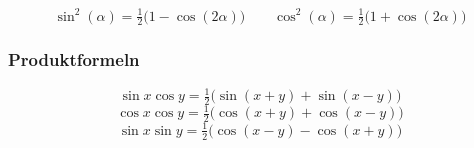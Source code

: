 \documentclass[../zusammenfassung_AN.tex]{subfiles}
\begin{document}
	\begin{tcolorbox}[dglbox, title={Quadratische Ausdrücke (aus Doppelwinkeltheorem)}]
		\[
		\sin^2(\alpha) = \tfrac{1}{2}\bigl(1-\cos(2\alpha)\bigr)
		\qquad
		\cos^2(\alpha) = \tfrac{1}{2}\bigl(1+\cos(2\alpha)\bigr)
		\]
	\end{tcolorbox}
	
	\subsubsection{Produktformeln}
	
	\begin{tcolorbox}[formelbox]
		\[
		\sin x\cos y = \tfrac{1}{2}\bigl(\sin(x+y)+\sin(x-y)\bigr)
		\]
		\[
		\cos x\cos y = \tfrac{1}{2}\bigl(\cos(x+y)+\cos(x-y)\bigr)
		\]
		\[
		\sin x\sin y = \tfrac{1}{2}\bigl(\cos(x-y)-\cos(x+y)\bigr)
		\]
	\end{tcolorbox}
	
\end{document}
